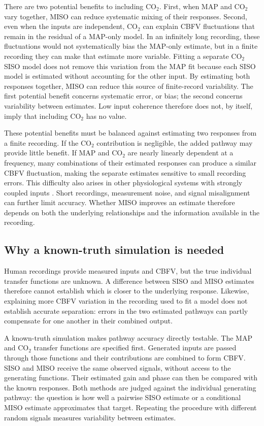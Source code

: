 \documentclass[12pt]{article}
\begin{document}
There are two potential benefits to including CO$_2$. First, when MAP and
CO$_2$ vary together, MISO can reduce systematic mixing of their responses.
Second, even when the inputs are independent, CO$_2$ can explain CBFV
fluctuations that remain in the residual of a MAP-only model. In an infinitely
long recording, these fluctuations would not systematically bias the MAP-only
estimate, but in a finite recording they can make that estimate more variable.
Fitting a separate CO$_2$ SISO model does not remove this variation from the
MAP fit because each SISO model is estimated without accounting for the other
input. By estimating both responses together, MISO can reduce this source of
finite-record variability. The first potential benefit concerns systematic
error, or bias; the second concerns variability between estimates. Low input
coherence therefore does not, by itself, imply that including CO$_2$ has no
value.

These potential benefits must be balanced against estimating two responses
from a finite recording. If the CO$_2$ contribution is negligible, the added
pathway may provide little benefit. If MAP and CO$_2$ are nearly linearly
dependent at a frequency, many combinations of their estimated responses can
produce a similar CBFV fluctuation, making the separate estimates sensitive to
small recording errors. This difficulty also arises in other physiological
systems with strongly coupled inputs \cite{Westwick2006}. Short recordings,
measurement noise, and signal misalignment can further limit accuracy. Whether
MISO improves an estimate therefore depends on both the underlying
relationships and the information available in the recording.

\subsection{Why a known-truth simulation is needed}

Human recordings provide measured inputs and CBFV, but the true individual
transfer functions are unknown. A difference between SISO and MISO estimates
therefore cannot establish which is closer to the underlying response.
Likewise, explaining more CBFV variation in the recording used to fit a model
does not establish accurate separation: errors in the two estimated pathways
can partly compensate for one another in their combined output.

A known-truth simulation makes pathway accuracy directly testable. The MAP
and CO$_2$ transfer functions are specified first. Generated inputs are passed
through those functions and their contributions are combined to form CBFV.
SISO and MISO receive the same observed signals, without access to the
generating functions. Their estimated gain and phase can then be compared
with the known responses. Both methods are judged against the individual
generating pathway: the question is how well a pairwise SISO estimate or a
conditional MISO estimate approximates that target. Repeating the procedure
with different random signals measures variability between estimates.
\end{document}

